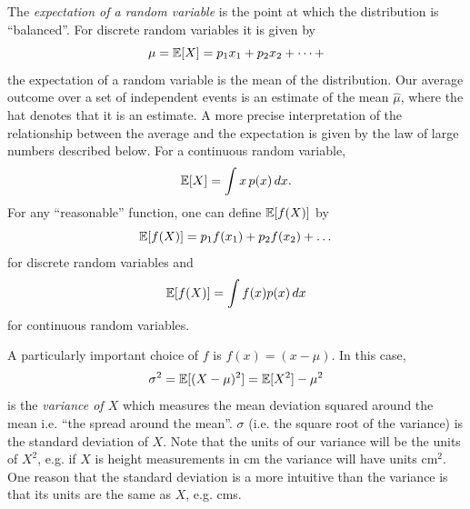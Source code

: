 The  \emph{expectation
  of a random variable} is the point at which the distribution is
``balanced''. For discrete random variables it is given by 
\begin{equation}
\mu = \mathbb{E}[X]=p_1x_1+p_2x_2+\dots + 
\end{equation} 
the expectation of a random variable is the mean of the distribution. 
Our average outcome 
over a set of independent
events is an estimate of the mean $\hat{\mu}$, where the hat denotes
that it is an estimate. A more precise interpretation of the
relationship between the average and the expectation is given by the law of large numbers described below. For a continuous random variable, 
\begin{equation}
\mathbb{E}[X]=\int x\,p(x)\,dx.
\end{equation}
For any ``reasonable'' function, one can define $\mathbb{E}[f(X)]$ by %
\begin{equation}
\mathbb{E}[f(X)]=p_1f(x_1)+p_2 f(x_2)+\dots
\end{equation}
for discrete random variables and 
\begin{equation}
\mathbb{E}[f(X)]=\int f(x)p(x)\,dx
\end{equation}
for continuous random variables. 

A particularly important choice of $f$ is $f(x)=(x-\mu)$. In this case, 
\begin{equation}
\sigma^2 = \mathbb{E}[(X-\mu)^2]= \mathbb{E}[X^2]-\mu^2
\end{equation}
is the  \emph{variance of $X$} which measures the mean deviation
squared around the mean i.e. ``the spread around the mean''. $\sigma$
(i.e. the square root of the variance) is the standard deviation of
$X$.
Note that the units of our variance will be the units of $X^2$,
e.g. if $X$ is height measurements in cm the variance will have units
cm$^2$. One reason that the standard deviation is a more intuitive
than the variance is that its units are the same as $X$, e.g.  cms. 


